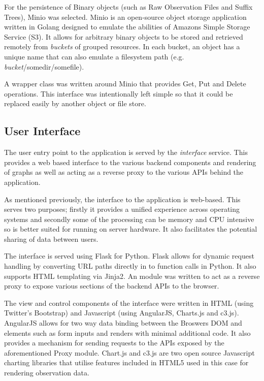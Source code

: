 \documentclass[../report.tex]{subfiles}
\begin{document}
	For the persistence of Binary objects (such as Raw Observation Files and Suffix Trees), Minio was selected.  Minio is an open-source object storage application written in Golang designed to emulate the abilities of Amazons Simple Storage Service (S3).  It allows for arbitrary binary objects to be stored and retrieved remotely from \textit{buckets} of grouped resources.  In each bucket, an object has a unique name that can also emulate a filesystem path (e.g. \textit{bucket}/somedir/somefile).
	
	A wrapper class was written around Minio that provides Get, Put and Delete operations.  This interface was intentionally left simple so that it could be replaced easily by another object or file store.
	
\subsection{User Interface}
	The user entry point to the application is served by the \textit{interface} service.  This provides a web based interface to the various backend components and rendering of graphs as well as acting as a reverse proxy to the various APIs behind the application.
	
	As mentioned previously, the interface to the application is web-based.  This serves two purposes; firstly it provides a unified experience across operating systems and secondly some of the processing can be memory and CPU intensive so is better suited for running on server hardware.  It also facilitates the potential sharing of data between users.
	
	The interface is served using Flask for Python.  Flask allows for dynamic request handling by converting URL paths directly in to function calls in Python.  It also supports HTML templating via Jinja2.  An module was written to act as a reverse proxy to expose various sections of the backend APIs to the browser.
	
	The view and control components of the interface were written in HTML (using Twitter's Bootstrap) and Javascript (using AngularJS, Charts.js and c3.js).  AngularJS allows for two way data binding between the Broswers DOM and elements such as form inputs and renders with minimal additional code.  It also provides a mechanism for sending requests to the APIs exposed by the aforementioned Proxy module.  Chart.js and c3.js are two open source Javascript charting libraries that utilise features included in HTML5 used in this case for rendering observation data.
\end{document}
